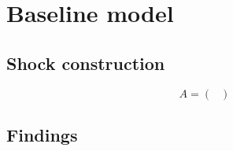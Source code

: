 \section{Baseline model}
\label{sec:baseline_model}
\blindtext

\subsection{Shock construction}
\label{sec:shock_construction}


\blindtext
\begin{equation}
    A =
    \begin{pmatrix}
        
    \end{pmatrix}
\end{equation}

\subsection{Findings}
\label{sec:findings}


\blindtext